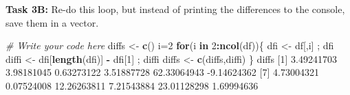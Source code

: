 \documentclass[]{book}
\newenvironment{Shaded}{\begin{snugshade}}{\end{snugshade}}
\newcommand{\CommentTok}[1]{\textcolor[rgb]{0.56,0.35,0.01}{\textit{#1}}}
\newcommand{\ControlFlowTok}[1]{\textcolor[rgb]{0.13,0.29,0.53}{\textbf{#1}}}
\newcommand{\DecValTok}[1]{\textcolor[rgb]{0.00,0.00,0.81}{#1}}
\newcommand{\FloatTok}[1]{\textcolor[rgb]{0.00,0.00,0.81}{#1}}
\newcommand{\KeywordTok}[1]{\textcolor[rgb]{0.13,0.29,0.53}{\textbf{#1}}}
\newcommand{\NormalTok}[1]{#1}
\newcommand{\OperatorTok}[1]{\textcolor[rgb]{0.81,0.36,0.00}{\textbf{#1}}}
\newcommand{\StringTok}[1]{\textcolor[rgb]{0.31,0.60,0.02}{#1}}
\begin{document}
\begin{Shaded}
\end{Shaded}

\textbf{Task 3B:} Re-do this loop, but instead of printing the differences to the console, save them in a vector.

\begin{Shaded}
\begin{Highlighting}[]
\CommentTok{# Write your code here}
\NormalTok{diffs <-}\StringTok{ }\KeywordTok{c}\NormalTok{()}
\NormalTok{i=}\DecValTok{2}
\ControlFlowTok{for}\NormalTok{(i }\ControlFlowTok{in} \DecValTok{2}\OperatorTok{:}\KeywordTok{ncol}\NormalTok{(df))\{}
\NormalTok{  dfi <-}\StringTok{ }\NormalTok{df[,i] ; dfi}
\NormalTok{  diffi <-}\StringTok{ }\NormalTok{dfi[}\KeywordTok{length}\NormalTok{(dfi)] }\OperatorTok{-}\StringTok{ }\NormalTok{dfi[}\DecValTok{1}\NormalTok{] ; diffi}
\NormalTok{  diffs <-}\StringTok{ }\KeywordTok{c}\NormalTok{(diffs,diffi)}
\NormalTok{\}}
\NormalTok{diffs}
\NormalTok{ [}\DecValTok{1}\NormalTok{]  }\FloatTok{3.49241703}  \FloatTok{3.98181045}  \FloatTok{0.63273122}  \FloatTok{3.51887728} \FloatTok{62.33064943} \FloatTok{-9.14624362}
\NormalTok{ [}\DecValTok{7}\NormalTok{]  }\FloatTok{4.73004321}  \FloatTok{0.07524008} \FloatTok{12.26263811}  \FloatTok{7.21543884} \FloatTok{23.01128298}  \FloatTok{1.69994636}
\end{Highlighting}
\end{Shaded}
\end{document}
